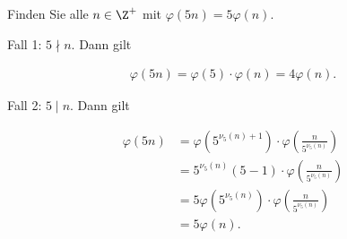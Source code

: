 
\begin{exercise}

Finden Sie alle $n \in \Z^+$ mit $\varphi(5n) = 5\varphi(n)$.
\end{exercise}


\begin{solution}

Fall 1: $5 \nmid n$. Dann gilt

\begin{align*}
    \varphi(5n) = \varphi(5)\cdot \varphi(n) = 4\varphi(n).
\end{align*}

Fall 2: $5 \mid n$. Dann gilt

\begin{align*}
    \varphi(5n) &= \varphi(5^{\nu_5(n) + 1})\cdot \varphi\left(\frac{n}{5^{\nu_5(n)}}\right) \\
    &= 5^{\nu_5(n)}(5 - 1)\cdot \varphi\left(\frac{n}{5^{\nu_5(n)}}\right) \\
    &= 5 \varphi(5^{\nu_5(n)})\cdot \varphi\left(\frac{n}{5^{\nu_5(n)}}\right) \\
    &= 5 \varphi(n).
\end{align*}

\end{solution}

